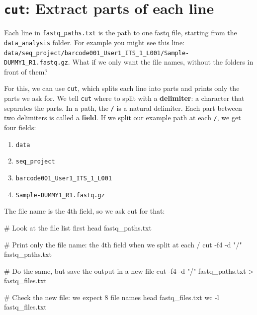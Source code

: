 \documentclass[
  letterpaper,
  DIV=11,
  numbers=noendperiod]{scrreprt}
\newenvironment{Shaded}{}{}
\newcommand{\AttributeTok}[1]{\textcolor[rgb]{0.84,0.23,0.29}{#1}}
\newcommand{\CommentTok}[1]{\textcolor[rgb]{0.42,0.45,0.49}{#1}}
\newcommand{\FunctionTok}[1]{\textcolor[rgb]{0.44,0.26,0.76}{#1}}
\newcommand{\NormalTok}[1]{\textcolor[rgb]{0.14,0.16,0.18}{#1}}
\newcommand{\OperatorTok}[1]{\textcolor[rgb]{0.14,0.16,0.18}{#1}}
\newcommand{\StringTok}[1]{\textcolor[rgb]{0.01,0.18,0.38}{#1}}
\providecommand{\tightlist}{%
  \setlength{\itemsep}{0pt}\setlength{\parskip}{0pt}}
\begin{document}
\section{\texorpdfstring{\texttt{cut}: Extract parts of each
line}{cut: Extract parts of each line}}\label{cut-extract-parts-of-each-line}

Each line in \texttt{fastq\_paths.txt} is the path to one fastq file,
starting from the \texttt{data\_analysis} folder. For example you might
see this line:
\texttt{data/seq\_project/barcode001\_User1\_ITS\_1\_L001/Sample-DUMMY1\_R1.fastq.gz}.
What if we only want the file names, without the folders in front of
them?

For this, we can use \texttt{cut}, which splits each line into parts and
prints only the parts we ask for. We tell \texttt{cut} where to split
with a \textbf{delimiter}: a character that separates the parts. In a
path, the \texttt{/} is a natural delimiter. Each part between two
delimiters is called a \textbf{field}. If we split our example path at
each \texttt{/}, we get four fields:

\begin{enumerate}
\def\labelenumi{\arabic{enumi}.}
\tightlist
\item
  \texttt{data}
\item
  \texttt{seq\_project}
\item
  \texttt{barcode001\_User1\_ITS\_1\_L001}
\item
  \texttt{Sample-DUMMY1\_R1.fastq.gz}
\end{enumerate}

The file name is the 4th field, so we ask cut for that:

\begin{Shaded}
\begin{Highlighting}[]
\CommentTok{\# Look at the file list first}
\FunctionTok{head}\NormalTok{ fastq\_paths.txt}

\CommentTok{\# Print only the file name: the 4th field when we split at each /}
\FunctionTok{cut} \AttributeTok{{-}f4} \AttributeTok{{-}d} \StringTok{"/"}\NormalTok{ fastq\_paths.txt}

\CommentTok{\# Do the same, but save the output in a new file}
\FunctionTok{cut} \AttributeTok{{-}f4} \AttributeTok{{-}d} \StringTok{"/"}\NormalTok{ fastq\_paths.txt }\OperatorTok{\textgreater{}}\NormalTok{ fastq\_files.txt}

\CommentTok{\# Check the new file: we expect 8 file names}
\FunctionTok{head}\NormalTok{ fastq\_files.txt}
\FunctionTok{wc} \AttributeTok{{-}l}\NormalTok{ fastq\_files.txt}
\end{Highlighting}
\end{Shaded}
\end{document}
